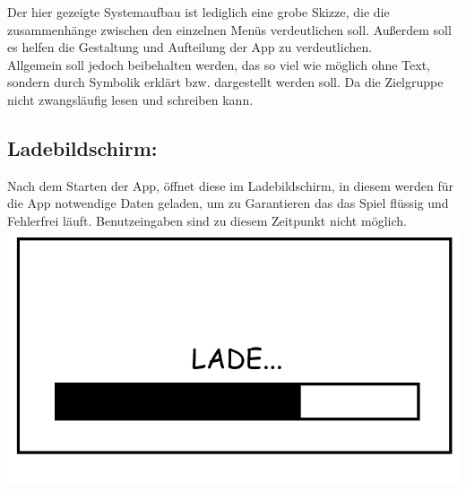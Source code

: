 \documentclass{scrartcl}
\begin{document}
Der hier gezeigte Systemaufbau ist lediglich eine grobe \glqq Skizze\grqq,
die die zusammenhänge zwischen den einzelnen Menüs verdeutlichen soll.
Außerdem soll es helfen die Gestaltung und Aufteilung der App zu verdeutlichen.\\
Allgemein soll jedoch beibehalten werden, das so viel wie möglich ohne Text, sondern durch Symbolik erklärt bzw. dargestellt werden soll. Da die Zielgruppe nicht zwangsläufig lesen und schreiben kann.
\begin{enumerate}
	\begin{minipage}{1\textwidth}
		\item \subsection*{Ladebildschirm:} \label{appaufbau:Ladebildschirm}
		Nach dem Starten der App, öffnet diese im Ladebildschirm, in diesem werden für die App notwendige Daten geladen, um zu Garantieren das das Spiel flüssig und Fehlerfrei läuft. Benutzeingaben sind zu diesem Zeitpunkt nicht möglich.\\
		\includegraphics[width=\textwidth, height=7.5cm]{assets/LoadScreen}
	\end{minipage}
	

\end{enumerate}
\end{document}
